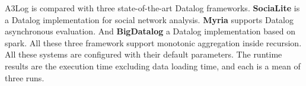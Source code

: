A3Log is compared with three state-of-the-art Datalog frameworks. \textbf{SociaLite} \cite{Lam:2013:SDE:2510649.2511289,Seo:2013:DSD:2556549.2556572} is a Datalog implementation for social network analysis. \textbf{Myria} \cite{Halperin:2014:DMB:2588555.2594530,Wang:2015:AFR:2824032.2824052} supports Datalog asynchronous evaluation. And \textbf{BigDatalog}\cite{Shkapsky:2016:BDA:2882903.2915229} a Datalog implementation based on spark. All these three framework support monotonic aggregation inside recursion.
All these systems are configured with their default parameters.
 The runtime results are the execution time excluding data loading time, and each is a mean of three runs.

